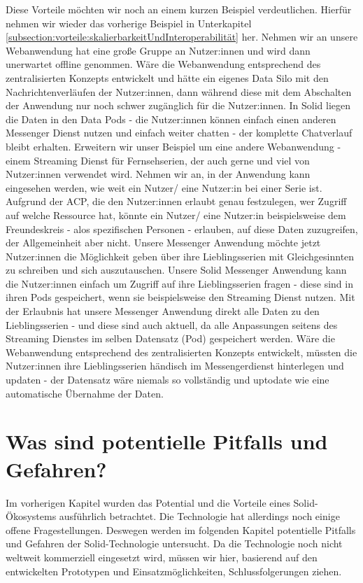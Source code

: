 \documentclass[acmtog]{acmart}
\begin{document}
Diese Vorteile möchten wir noch an einem kurzen Beispiel verdeutlichen. Hierfür nehmen wir wieder das vorherige Beispiel in Unterkapitel \ref{subsection:vorteile:skalierbarkeitUndInteroperabilität} her. 
Nehmen wir an unsere Webanwendung hat eine große Gruppe an Nutzer:innen und wird dann unerwartet offline genommen. Wäre die Webanwendung entsprechend des zentralisierten Konzepts entwickelt und hätte ein eigenes Data Silo mit den Nachrichtenverläufen der Nutzer:innen, dann während diese mit dem Abschalten der Anwendung nur noch schwer zugänglich für die Nutzer:innen. In Solid liegen die Daten in den Data Pods - die Nutzer:innen können einfach einen anderen Messenger Dienst nutzen und einfach weiter chatten - der komplette Chatverlauf bleibt erhalten.
Erweitern wir unser Beispiel um eine andere Webanwendung - einem Streaming Dienst für Fernsehserien, der auch gerne und viel von Nutzer:innen verwendet wird. Nehmen wir an, in der Anwendung kann eingesehen werden, wie weit ein Nutzer/ eine Nutzer:in bei einer Serie ist. Aufgrund der ACP, die den Nutzer:innen erlaubt genau festzulegen, wer Zugriff auf welche Ressource hat, könnte ein Nutzer/ eine Nutzer:in beispielsweise dem Freundeskreis - alos spezifischen Personen - erlauben, auf diese Daten zuzugreifen, der Allgemeinheit aber nicht. 
Unsere Messenger Anwendung möchte jetzt Nutzer:innen die Möglichkeit geben über ihre Lieblingsserien mit Gleichgesinnten zu schreiben und sich auszutauschen. Unsere Solid Messenger Anwendung kann die Nutzer:innen einfach um Zugriff auf ihre Lieblingsserien fragen - diese sind in ihren Pods gespeichert, wenn sie beispielsweise den Streaming Dienst nutzen. Mit der Erlaubnis hat unsere Messenger Anwendung direkt alle Daten zu den Lieblingsserien - und diese sind auch aktuell, da alle Anpassungen seitens des Streaming Dienstes im selben Datensatz (Pod) gespeichert werden. Wäre die Webanwendung entsprechend des zentralisierten Konzepts entwickelt, müssten die Nutzer:innen ihre Lieblingsserien händisch im Messengerdienst hinterlegen und updaten - der Datensatz wäre niemals so vollständig und uptodate wie eine automatische Übernahme der Daten.

\label{section:wasSindPotentiellePitfallsUndGefahren}
\section{Was sind potentielle Pitfalls und Gefahren?}

Im vorherigen Kapitel wurden das Potential und die Vorteile eines Solid-Ökosystems ausführlich betrachtet. Die Technologie hat allerdings noch einige offene Fragestellungen. Deswegen werden im folgenden Kapitel potentielle Pitfalls und Gefahren der Solid-Technologie untersucht. Da die Technologie noch nicht weltweit kommerziell eingesetzt wird, müssen wir hier, basierend auf den entwickelten Prototypen und Einsatzmöglichkeiten, Schlussfolgerungen ziehen.
\end{document}
